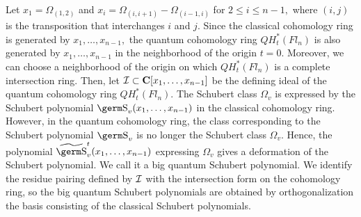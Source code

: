 Let $x_1 = \Omega _{(1,2)}$ and $x_i = \Omega _{(i,i+1)} - 
\Omega _{(i-1,i)}$ for $2\leq i\leq n-1,$ where $(i,j)$ is 
the transposition that interchanges $i$ and $j.$ 
Since the classical cohomology ring is generated by 
$x_1,\ldots ,x_{n-1},$ 
the quantum cohomology ring $QH^{\ast}_t(Fl_n)$ 
is also generated by $x_1,\ldots ,x_{n-1}$ in 
the neighborhood of the origin $t=0.$ Moreover, 
we can choose a neighborhood of the origin on 
which $QH^{\ast}_t(Fl_n)$ is a complete 
intersection ring. 
Then, let ${\cal I}\subset {\bf C}[x_1,\ldots 
,x_{n-1}]$ be the defining ideal of the quantum cohomology 
ring $QH^{\ast}_t(Fl_n).$ The Schubert class $\Omega _v$ is 
expressed by the Schubert polynomial ${\s}_v(x_1,\ldots ,
x_{n-1})$ in the classical cohomology ring. However, in the 
quantum cohomology ring, the class corresponding to the 
Schubert polynomial ${\s}_v$ is no longer the Schubert 
class $\Omega _v.$ Hence, the polynomial $\wt{\s}_{v}
^{t}(x_1,\ldots ,x_{n-1})$ expressing $\Omega _v$ gives a 
deformation of the Schubert polynomial. We call it a big
quantum Schubert polynomial. We identify the residue 
pairing defined by ${\cal I}$ with the intersection form on the 
cohomology ring, so the big quantum Schubert polynomials are 
obtained by orthogonalization the basis consisting of the 
classical Schubert polynomials. 

